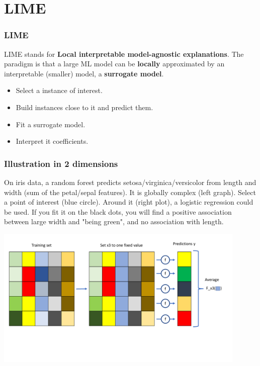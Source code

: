 \section{LIME}
\begin{frame}
\frametitle{LIME}
LIME stands for {\bf Local interpretable model-agnostic explanations}. The paradigm is that a large ML model can be {\bf locally} approximated by an interpretable (smaller) model, a {\bf surrogate model}. 
\begin{itemize}
\item Select a instance of interest.
\item Build instances close to it and predict them.
\item Fit a surrogate model.
\item Interpret it coefficients.
\end{itemize}
\end{frame}
\begin{frame}
\frametitle{Illustration in 2 dimensions}
\small
On iris data, a random forest predicts setosa/virginica/versicolor from length and width (sum of the petal/sepal features). It is globally complex (left graph). Select a point of interest (blue circle). Around it (right plot), a logistic regression could be used. If you fit it on the black dots, you will find a positive association between large width and "being green", and no association with length. 
\normalsize
\begin{center}
\includegraphics[width=12cm, page=2]{../Graphs/LIME_illustr.pdf}
\end{center}
\end{frame}

